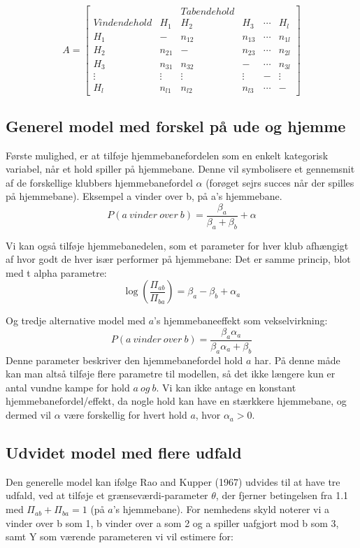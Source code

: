 \documentclass[11pt,a4paper]{article}
\begin{document}
$$
A = 
\begin{bmatrix}
&& Tabendehold &&
\\   
Vindendehold & H_1 & H_2 & H_3 & \cdots & H_l
\\ H_1 & - & n_{12} & n_{13} & \cdots & n_{1l} 
\\ H_2 & n_{21} & - & n_{23} & \cdots & n_{2l}
\\ H_3 & n_{31} & n_{32} & - & \cdots & n_{3l}
\\ \vdots & \vdots & \vdots & \vdots & - & \vdots
\\ H_l & n_{l1} &  n_{l2} & n_{l3} & \cdots & -
\end{bmatrix} 
$$

\subsection{Generel model med forskel på ude og hjemme}
Første mulighed, er at tilføje hjemmebanefordelen som en enkelt kategorisk variabel, når et hold spiller på hjemmebane. Denne vil symbolisere et gennemsnit af de forskellige klubbers hjemmebanefordel $\alpha$ (forøget sejrs succes når der spilles på hjemmebane). 
Eksempel a vinder over b, på a's hjemmebane. 
\begin{equation}
P(a\ vinder\ over\ b) = \frac{\beta_a}{\beta_a+\beta_b}+\alpha
\end{equation}

Vi kan også tilføje hjemmebanedelen, som et parameter for hver klub afhængigt af hvor godt de hver især performer på hjemmebane:
Det er samme princip, blot med t alpha parametre:
\begin{equation}
\log(\frac{\Pi_{ab}}{\Pi_{ba}}) = \beta_a-\beta_b + \alpha_a
\end{equation}

Og tredje alternative model med $a$'s hjemmebaneeffekt som vekselvirkning:
\begin{equation}
P(a\ vinder\ over\ b) = \frac{\beta_a\alpha_a}{\beta_a\alpha_a+\beta_b}
\end{equation}
Denne parameter beskriver den hjemmebanefordel hold $a$ har. På denne måde kan man altså tilføje flere parametre til modellen, så det ikke længere kun er antal vundne kampe for hold $a \ og \ b$. Vi kan ikke antage en konstant hjemmebanefordel/effekt, da nogle hold kan have en stærkkere hjemmebane, og dermed vil $\alpha$ være forskellig for hvert hold $a$, hvor $\alpha_a>0$.
\\
\subsection{Udvidet model med flere udfald}
Den generelle model kan ifølge Rao and Kupper (1967) udvides til at have tre udfald, ved at tilføje et grænseværdi-parameter $\theta$, der fjerner betingelsen fra 1.1 med $\Pi_{ab}+\Pi_{ba}=1$ (på $a$'s hjemmebane). For nemhedens skyld noterer vi a vinder over b som 1, b vinder over a som 2 og a spiller uafgjort mod b som 3, samt Y som værende parameteren vi vil estimere for:
\end{document}

